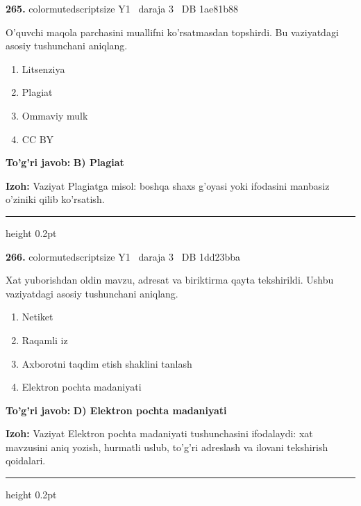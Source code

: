 \documentclass[10pt,a4paper,oneside]{article}
\begin{document}
\noindent\textbf{\color{ink}265.}  {color{muted}scriptsize Y1 \textbullet\ daraja 3 \textbullet\ DB 1ae81b88}
\par
O'quvchi maqola parchasini muallifni ko'rsatmasdan topshirdi. Bu vaziyatdagi asosiy tushunchani aniqlang.
\begin{enumerate}[label=\Alph*),leftmargin=9mm]
\item Litsenziya
\item Plagiat
\item Ommaviy mulk
\item CC BY
\end{enumerate}
\begin{tcolorbox}[enhanced,breakable,colback=teal!4,colframe=teal!50!black,boxrule=0.5pt,arc=1.1mm,left=3mm,right=3mm,top=1.7mm,bottom=1.7mm,before skip=2mm,after skip=2mm]
\textbf{\color{teal}To'g'ri javob:} \textbf{B) Plagiat}
\par\smallskip
\textbf{Izoh:} Vaziyat Plagiatga misol: boshqa shaxs g'oyasi yoki ifodasini manbasiz o'ziniki qilib ko'rsatish.
\end{tcolorbox}
\vspace{2mm}\hrule height 0.2pt \vspace{3mm}

\noindent\textbf{\color{ink}266.}  {color{muted}scriptsize Y1 \textbullet\ daraja 3 \textbullet\ DB 1dd23bba}
\par
Xat yuborishdan oldin mavzu, adresat va biriktirma qayta tekshirildi. Ushbu vaziyatdagi asosiy tushunchani aniqlang.
\begin{enumerate}[label=\Alph*),leftmargin=9mm]
\item Netiket
\item Raqamli iz
\item Axborotni taqdim etish shaklini tanlash
\item Elektron pochta madaniyati
\end{enumerate}
\begin{tcolorbox}[enhanced,breakable,colback=teal!4,colframe=teal!50!black,boxrule=0.5pt,arc=1.1mm,left=3mm,right=3mm,top=1.7mm,bottom=1.7mm,before skip=2mm,after skip=2mm]
\textbf{\color{teal}To'g'ri javob:} \textbf{D) Elektron pochta madaniyati}
\par\smallskip
\textbf{Izoh:} Vaziyat Elektron pochta madaniyati tushunchasini ifodalaydi: xat mavzusini aniq yozish, hurmatli uslub, to'g'ri adreslash va ilovani tekshirish qoidalari.
\end{tcolorbox}
\vspace{2mm}\hrule height 0.2pt \vspace{3mm}
\end{document}
